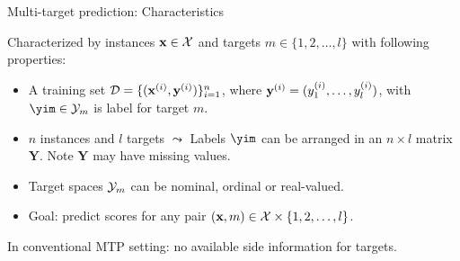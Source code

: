 \documentclass[11pt,compress,t,notes=noshow, xcolor=table]{beamer}
\begin{document}
\begin{frame}{Multi-target prediction: Characteristics}

    Characterized by instances $\mathbf{x} \in \mathcal{X}$ and targets $m \in \{1, 2, \ldots, l\}$ with following properties: 

    \begin{itemize} \small


        \item A training set $\mathcal{D} = \{(\mathbf{x}^{(i)}, \mathbf{y}^{(i)})\}_{i=1}^n$, where $\mathbf{y}^{(i)} = (y^{(i)}_1, \dots, y^{(i)}_l)$, with $\yim \in \Yspace_m$ is label for target $m$.  
      
        \item $n$ instances and $l$ targets $\leadsto$ Labels $\yim$ can be arranged in an $n \times l$ matrix $\bm{Y}$. Note $\bm{Y}$ may have missing values.

        \item Target spaces $\mathcal{Y}_m$ can be nominal, ordinal or real-valued.  
    
        \item Goal: predict scores for any pair $(\mathbf{x}, m) \in \mathcal{X} \times \{1, 2, \ldots, l\}$.  
    
    \end{itemize}
In conventional MTP setting: no available side information for targets. 
\end{frame}

\end{document}
